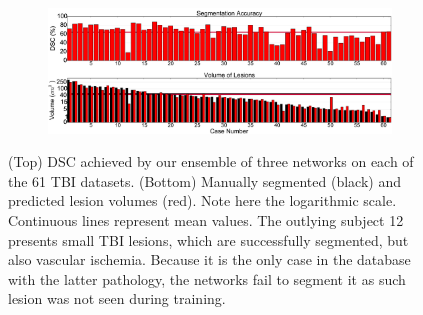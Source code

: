 
\begin{figure}[!ht]
\centering
\begin{subfigure}[b]{1.0\textwidth}
	\centering
	\includegraphics[clip=true, trim=0pt 0pt 0pt 0pt, width=1.0\textwidth]{figures/evaluationSection/tbi/resultsVsLesionVolume/tbiAccuracyJournal_nonReg.png}
\end{subfigure}
\vspace{-0pt} %
\caption{(Top) DSC achieved by our ensemble of three networks on each of the 61 TBI datasets. (Bottom) Manually segmented (black) and predicted lesion volumes (red). Note here the logarithmic scale. Continuous lines represent mean values. The outlying subject 12 presents small TBI lesions, which are successfully segmented, but also vascular ischemia. Because it is the only case in the database with the latter pathology, the networks fail to segment it as such lesion was not seen during training.}
\label{fig:evalTbiAccVsVol}
\vspace{-10pt}
\end{figure}
